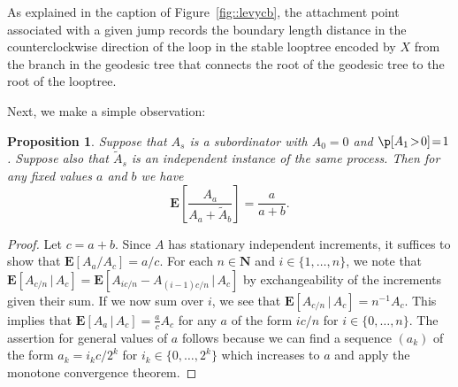\documentclass[10pt]{amsart}
\theoremstyle{plain}
\numberwithin{theorem}{section}
\newtheorem{proposition}[theorem]{Proposition}
\theoremstyle{definition}
\newcommand \E {{\mathbf E}}
\newcommand{\N}{\mathbf{N}}
\let\wt\widetilde
\newcommand{\giv}{\,|\,}
\begin{document}
As explained in the caption of Figure~\ref{fig::levycb}, the attachment point associated with a given jump records the boundary length distance in the counterclockwise direction of the loop in the stable looptree encoded by $X$ from the branch in the geodesic tree that connects the root of the geodesic tree to the root of the looptree.

Next, we make a simple observation:

\begin{proposition}
\label{prop::easyexpectationratiofact}
Suppose that $A_s$ is a subordinator with $A_0\!=\!0$ and $\p[A_1\!>\!0]\!=\!1$. Suppose also that $\wt A_s$ is an independent instance of the same process. Then for any fixed values $a$ and $b$ we have
\begin{equation}
\label{eqn::a_wt_b_ratio}
\E \left[\frac{A_a}{A_a + \wt A_b} \right] = \frac{a}{a+b}.
\end{equation}
\end{proposition}
\begin{proof}
Let $c = a+b$. Since $A$ has stationary independent increments, it suffices to show that $\E[ A_a/A_c] = a/c$. For each $n \in \N$ and $i \in \{1,\ldots,n\}$, we note that $\E[ A_{c/n} \giv A_c] = \E[ A_{ic/n} - A_{(i-1)c/n} \giv A_c]$ by exchangeability of the increments given their sum. If we now sum over $i$, we see that $\E[ A_{c/n} \giv A_c] = n^{-1} A_c$. This implies that $\E[ A_a \giv A_c] = \tfrac{a}{c} A_c$ for any $a$ of the form $i c/n$ for $i \in \{0,\ldots,n\}$. The assertion for general values of $a$ follows because we can find a sequence $(a_k)$ of the form $a_k = i_k c / 2^k$ for $i_k \in \{0,\ldots,2^k\}$ which increases to $a$ and apply the monotone convergence theorem.
\end{proof}
\end{document}
